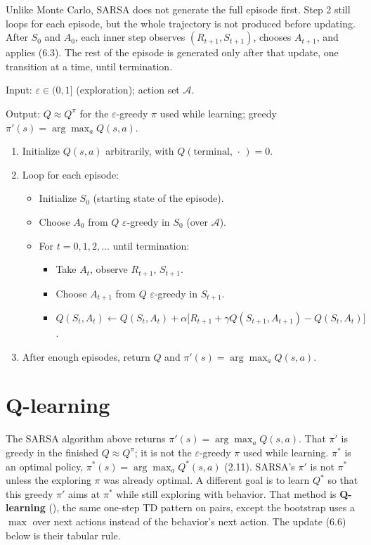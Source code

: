Unlike Monte Carlo, SARSA does not generate the full episode first. Step 2 still loops for each episode, but the whole trajectory is not produced before updating. After $S_0$ and $A_0$, each inner step observes $(R_{t+1},S_{t+1})$, chooses $A_{t+1}$, and applies (6.3). The rest of the episode is generated only after that update, one transition at a time, until termination.

\begin{implnote}
Input: $\varepsilon\in(0,1]$ (exploration); action set $\mathcal{A}$.

Output: $Q\approx Q^\pi$ for the $\varepsilon$-greedy $\pi$ used while learning; greedy $\pi'(s)=\arg\max_a Q(s,a)$.

\begin{enumerate}
\item Initialize $Q(s,a)$ arbitrarily, with $Q(\text{terminal},\,\cdot\,)=0$.
\item Loop for each episode:
\begin{itemize}
\item Initialize $S_0$ (starting state of the episode).
\item Choose $A_0$ from $Q$ $\varepsilon$-greedy in $S_0$ (over $\mathcal{A}$).
\item For $t=0,1,2,\ldots$ until termination:
\begin{itemize}
\item Take $A_t$, observe $R_{t+1}$, $S_{t+1}$.
\item Choose $A_{t+1}$ from $Q$ $\varepsilon$-greedy in $S_{t+1}$.
\item $Q(S_t,A_t)\leftarrow Q(S_t,A_t)+\alpha\bigl[R_{t+1}+\gamma Q(S_{t+1},A_{t+1})-Q(S_t,A_t)\bigr]$.
\end{itemize}
\end{itemize}
\item After enough episodes, return $Q$ and $\pi'(s)=\arg\max_a Q(s,a)$.
\end{enumerate}

\end{implnote}




\section{Q-learning}

The SARSA algorithm above returns $\pi'(s)=\arg\max_a Q(s,a)$. That $\pi'$ is greedy in the finished $Q\approx Q^\pi$; it is not the $\varepsilon$-greedy $\pi$ used while learning. $\pi^*$ is an optimal policy, $\pi^*(s)=\arg\max_a Q^*(s,a)$ (2.11). SARSA's $\pi'$ is not $\pi^*$ unless the exploring $\pi$ was already optimal. A different goal is to learn $Q^*$ so that this greedy $\pi'$ aims at $\pi^*$ while still exploring with behavior. That method is \textbf{Q-learning} (), the same one-step TD pattern on pairs, except the bootstrap uses a $\max$ over next actions instead of the behavior's next action. The update (6.6) below is their tabular rule.

